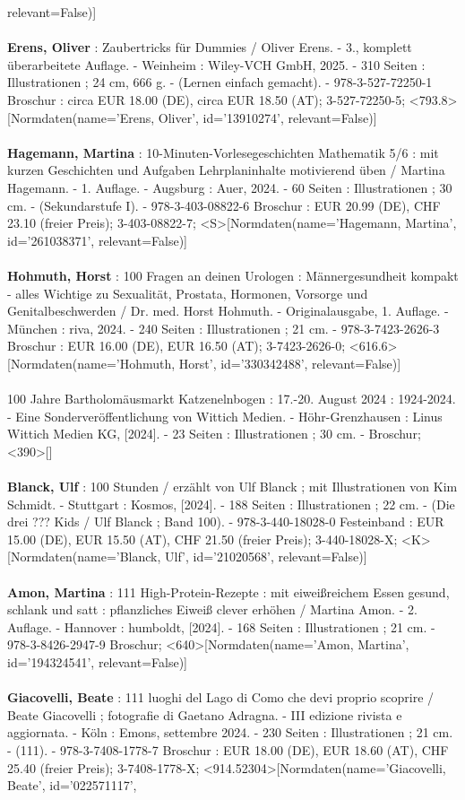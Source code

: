 \documentclass{article}
\begin{document}
\begin{multicols}{3}
relevant=False)]\\\\\textbf{Erens, Oliver} : Zaubertricks für Dummies / Oliver Erens. - 3., komplett überarbeitete Auflage. - Weinheim : Wiley-VCH GmbH, 2025. - 310 Seiten : Illustrationen ; 24 cm, 666 g. - (Lernen einfach gemacht). - 978-3-527-72250-1 Broschur : circa EUR 18.00 (DE), circa EUR 18.50 (AT); 3-527-72250-5; <793.8>[Normdaten(name='Erens, Oliver', id='13910274', relevant=False)]\\\\\textbf{Hagemann, Martina} : 10-Minuten-Vorlesegeschichten Mathematik 5/6 : mit kurzen Geschichten und Aufgaben Lehrplaninhalte motivierend üben / Martina Hagemann. - 1. Auflage. - Augsburg : Auer, 2024. - 60 Seiten : Illustrationen ; 30 cm. - (Sekundarstufe I). - 978-3-403-08822-6 Broschur : EUR 20.99 (DE), CHF 23.10 (freier Preis); 3-403-08822-7; <S>[Normdaten(name='Hagemann, Martina', id='261038371', relevant=False)]\\\\\textbf{Hohmuth, Horst} : 100 Fragen an deinen Urologen : Männergesundheit kompakt - alles Wichtige zu Sexualität, Prostata, Hormonen, Vorsorge und Genitalbeschwerden / Dr. med. Horst Hohmuth. - Originalausgabe, 1. Auflage. - München : riva, 2024. - 240 Seiten : Illustrationen ; 21 cm. - 978-3-7423-2626-3 Broschur : EUR 16.00 (DE), EUR 16.50 (AT); 3-7423-2626-0; <616.6>[Normdaten(name='Hohmuth, Horst', id='330342488', relevant=False)]\\\\100 Jahre Bartholomäusmarkt Katzenelnbogen : 17.-20. August 2024 : 1924-2024. - Eine Sonderveröffentlichung von Wittich Medien. - Höhr-Grenzhausen : Linus Wittich Medien KG, [2024]. - 23 Seiten : Illustrationen ; 30 cm. - Broschur; <390>[]\\\\\textbf{Blanck, Ulf} : 100 Stunden / erzählt von Ulf Blanck ; mit Illustrationen von Kim Schmidt. - Stuttgart : Kosmos, [2024]. - 188 Seiten : Illustrationen ; 22 cm. - (Die drei ??? Kids / Ulf Blanck ; Band 100). - 978-3-440-18028-0 Festeinband : EUR 15.00 (DE), EUR 15.50 (AT), CHF 21.50 (freier Preis); 3-440-18028-X; <K>[Normdaten(name='Blanck, Ulf', id='21020568', relevant=False)]\\\\\textbf{Amon, Martina} : 111 High-Protein-Rezepte : mit eiweißreichem Essen gesund, schlank und satt : pflanzliches Eiweiß clever erhöhen / Martina Amon. - 2. Auflage. - Hannover : humboldt, [2024]. - 168 Seiten : Illustrationen ; 21 cm. - 978-3-8426-2947-9 Broschur; <640>[Normdaten(name='Amon, Martina', id='194324541', relevant=False)]\\\\\textbf{Giacovelli, Beate} : 111 luoghi del Lago di Como che devi proprio scoprire / Beate Giacovelli ; fotografie di Gaetano Adragna. - III edizione rivista e aggiornata. - Köln : Emons, settembre 2024. - 230 Seiten : Illustrationen ; 21 cm. - (111). - 978-3-7408-1778-7 Broschur : EUR 18.00 (DE), EUR 18.60 (AT), CHF 25.40 (freier Preis); 3-7408-1778-X; <914.52304>[Normdaten(name='Giacovelli, Beate', id='022571117', 
\end{multicols}
\end{document}
